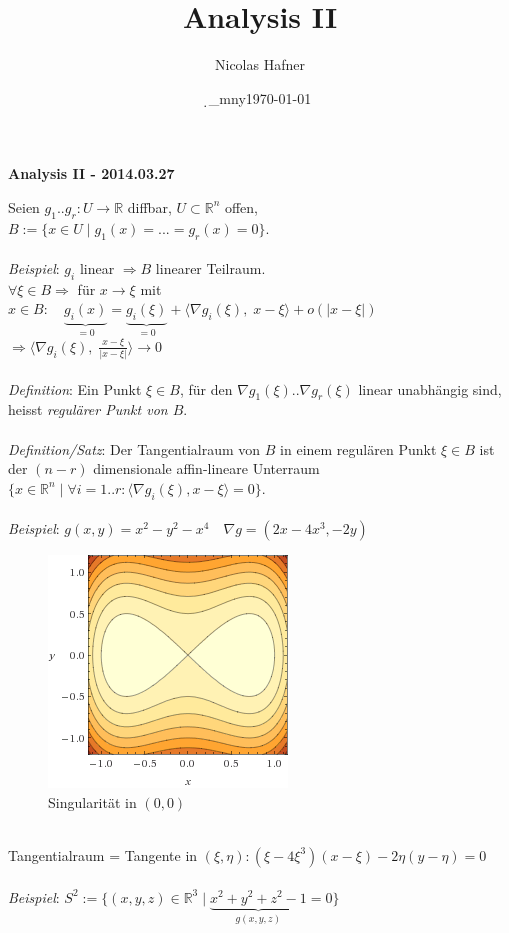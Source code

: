 \documentclass[12pt,a4paper,titlepage]{article}
\author{Nicolas Hafner}
\title{Analysis II}
\date{\d_mny\today}
\newcommand{\setR}{\mathbb{R}}
\begin{document}
	
\begin{center}{\bfseries\Huge Analysis II - 2014.03.27}\end{center}
Seien $g_1..g_r:U\to\setR$ diffbar, $U\subset\setR^n$ offen, $B:=\{x\in U\mid g_1(x)=...=g_r(x)=0\}$. \\
\\
\textit{Beispiel}: $g_i$ linear $\Rightarrow B$ linearer Teilraum. \\
$\forall\xi\in B \Rightarrow$ für $x\to\xi$ mit $x\in B: \quad \underbrace{g_i(x)}_{=0}= \underbrace{g_i(\xi)}_{=0}+\langle\nabla g_i(\xi),\;x-\xi\rangle+o(|x-\xi|)$ \\
$\Rightarrow \langle\nabla g_i(\xi),\;\frac{x-\xi}{|x-\xi|}\rangle\to 0$ \\
\\
\textit{Definition}: Ein Punkt $\xi\in B$, für den $\nabla g_1(\xi)..\nabla g_r(\xi)$ linear unabhängig sind, heisst \emph{regulärer Punkt von $B$}. \\
\\
\textit{Definition/Satz}: Der Tangentialraum von $B$ in einem regulären Punkt $\xi\in B$ ist der $(n-r)$ dimensionale affin-lineare Unterraum $\{x\in\setR^n\mid\forall i=1..r:\langle\nabla g_i(\xi),x-\xi\rangle = 0\}$. \\
\\
\textit{Beispiel}: $g(x,y)=x^2-y^2-x^4 \quad \nabla g=(2x-4x^3,-2y)$ \\
\begin{figure}[h!]
  \centering
  \includegraphics[keepaspectratio=true,scale=0.75]{WolframAlpha--x_2_y_2_x_4__Contour_plot__2014_03_27_0433.png}
  \caption{Singularität in $(0,0)$}
\end{figure} \\
Tangentialraum = Tangente in $(\xi,\eta):(\xi-4\xi^3)(x-\xi)-2\eta(y-\eta)=0$ \\
\\
\textit{Beispiel}: $S^2:=\{(x,y,z)\in\setR^3\mid \underbrace{x^2+y^2+z^2-1}_{g(x,y,z)}=0\} $ \\
\end{document}
